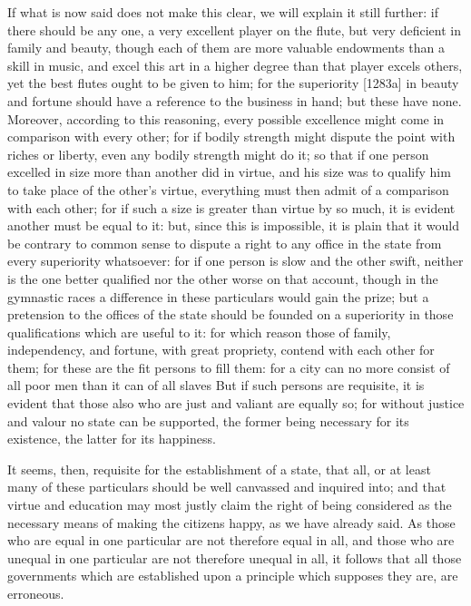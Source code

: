 If what is now said does not make this clear, we will explain it still
further: if there should be any one, a very excellent player on the flute,
but very deficient in family and beauty, though each of them are more
valuable endowments than a skill in music, and excel this art in a higher
degree than that player excels others, yet the best flutes ought to be
given to him; for the superiority [1283a] in beauty and fortune should
have a reference to the business in hand; but these have none. Moreover,
according to this reasoning, every possible excellence might come in
comparison with every other; for if bodily strength might dispute the
point with riches or liberty, even any bodily strength might do it; so
that if one person excelled in size more than another did in virtue, and
his size was to qualify him to take place of the other's virtue,
everything must then admit of a comparison with each other; for if such a
size is greater than virtue by so much, it is evident another must be
equal to it: but, since this is impossible, it is plain that it would be
contrary to common sense to dispute a right to any office in the state
from every superiority whatsoever: for if one person is slow and the other
swift, neither is the one better qualified nor the other worse on that
account, though in the gymnastic races a difference in these particulars
would gain the prize; but a pretension to the offices of the state should
be founded on a superiority in those qualifications which are useful to
it: for which reason those of family, independency, and fortune, with
great propriety, contend with each other for them; for these are the fit
persons to fill them: for a city can no more consist of all poor men than
it can of all slaves But if such persons are requisite, it is evident that
those also who are just and valiant are equally so; for without justice
and valour no state can be supported, the former being necessary for its
existence, the latter for its happiness.


It seems, then, requisite for the establishment of a state, that all, or
at least many of these particulars should be well canvassed and inquired
into; and that virtue and education may most justly claim the right of
being considered as the necessary means of making the citizens happy, as
we have already said. As those who are equal in one particular are not
therefore equal in all, and those who are unequal in one particular are
not therefore unequal in all, it follows that all those governments which
are established upon a principle which supposes they are, are erroneous.

